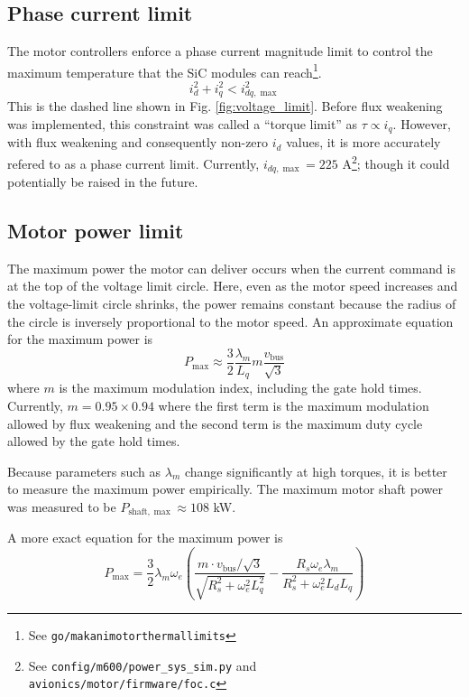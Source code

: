 \documentclass[11pt]{amsart}
\newcommand{\shaft}{\mathrm{shaft}}
\newcommand{\bus}{\mathrm{bus}}
\begin{document}

\subsection{Phase current limit}

The motor controllers enforce a phase current magnitude limit to
control the maximum temperature that the SiC modules can reach\footnote{See
       {\texttt{go/makanimotorthermallimits}}}.
%
\begin{equation}
  i_d^2 + i_q^2 < i_{dq,\max}^2
\end{equation}
%
This is the dashed line shown in Fig. \ref{fig:voltage_limit}.  Before
flux weakening was implemented, this constraint was called a ``torque
limit'' as $\tau \propto i_q$.  However, with flux weakening and
consequently non-zero $i_d$ values, it is more accurately refered to
as a phase current limit.  Currently, $i_{dq,\max} = 225$
A\footnote{See
  {\texttt{config/m600/power\_sys\_sim.py}} and \\
  {\texttt{avionics/motor/firmware/foc.c}}}; though it
could potentially be raised in the future.

\subsection{Motor power limit}

The maximum power the motor can deliver occurs when the current
command is at the top of the voltage limit circle.  Here, even as the
motor speed increases and the voltage-limit circle shrinks, the power
remains constant because the radius of the circle is inversely
proportional to the motor speed.  An approximate equation for the
maximum power is
%
\begin{equation}
  P_{\max} \approx \frac{3}{2} \frac{\lambda_m}{L_q} m \frac{v_{\bus}}{\sqrt{3}}
\end{equation}
%
where $m$ is the maximum modulation index, including the gate hold
times.  Currently, $m = 0.95 \times 0.94$ where the first term is the
maximum modulation allowed by flux weakening and the second term is
the maximum duty cycle allowed by the gate hold times.

Because parameters such as $\lambda_m$ change significantly at high
torques, it is better to measure the maximum power empirically.  The
maximum motor shaft power was measured to be
$P_{\shaft,\max} \approx 108$ kW.

A more exact equation for the maximum power is
%
\begin{equation}
  P_{\max} =
  \frac{3}{2} \lambda_m \omega_e
  \left(
    \frac{m \cdot v_{\bus} / \sqrt{3}}{\sqrt{R_s^2 + \omega_e^2 L_q^2}} -
    \frac{R_s \omega_e \lambda_m}{R_s^2 + \omega_e^2 L_d L_q}
  \right)
\end{equation}
\end{document}

